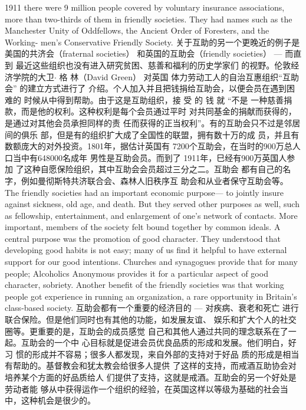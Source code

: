 \begin{paracol}{2}
1911 there were 9 million people covered by voluntary insurance associations, more than two-thirds of them in friendly societies. They had names such as the Manchester Unity of
Oddfellows, the Ancient Order of Foresters, and the Working-
men's Conservative Friendly Society.
\switchcolumn
关于互助的另一个更晚近的例子是美国的共济会（fraternal societies） 和英国的互助会（friendly societies） --- 而直到
最近这些组织也没有进入研究贫困、慈善和福利的历史学家们
的视野。伦敦经济学院的大卫$\cdot$ 格 林（David Green） 对英国
体力劳动工人的自治互惠组织“互助会” 的建立方式进行了
介绍。个人加入并且把钱捐给互助会，以便会员在遇到困难的
时候从中得到帮助。由于这是互助组织，接 受 的 钱 就 “不是
一种慈善捐款，而是他的权利。这种权利是每个会员通过平时
对共同基金的捐献而获得的，是通过对其他会员承担同样的责
任而获得的正当权利”。有的互助会只不过是邻居间的俱乐
部，但是有的组织扩大成了全国性的联盟，拥有数十万的成
员，并且有数额庞大的对外投资。1801年，据估计英国有
7200个互助会，在当时的900万总人口当中有648000名成年
男性是互助会员。而到了 1911年，巳经有900万英国人参加
了这种自愿保险组织，其中互助会会员超过三分之二。互助会
都有自己的名字，例如曼彻斯特共济联合会、森林人旧秩序互
助会和从业者保守互助会等。
\switchcolumn*
The friendly societies had an important economic purpose---
to jointly insure against sickness, old age, and death. But they
served other purposes as well, such as fellowship, entertainment, and enlargement of one's network of contacts. More important, members of the society felt bound together by
common ideals. A central purpose was the promotion of good
character. They understood that developing good habits is not
easy; many of us find it helpful to have external support for our
good intentions. Churches and synagogues provide that for
many people; Alcoholics Anonymous provides it for a particular
aspect of good character, sobriety. Another benefit of the friendly societies was that working people got experience in
running an organization, a rare opportunity in Britain's class-based society.
\switchcolumn
互助会都有一个重要的经济目的 --- 对疾病、衰老和死亡
进行联合保险。但是他们同时也有其他的功能，如发展友谊、
娱乐和扩大个人的社交圈等。更重要的是，互助会的成员感觉
自己和其他人通过共同的理念联系在了一起。互助会的一个中
心目标就是促进会员优良品质的形成和发展。他们明白，好习
惯的形成并不容易；很多人都发现，来自外部的支持对于好品
质的形成是相当有帮助的。基督教会和犹太教会给很多人提供
了这样的支持，而戒酒互助协会对培养某个方面的好品质给人
们提供了支持，这就是戒酒。互助会的另一个好处是劳动者能
够从中获得运作一个组织的经验，在英国这样以等级为基础的社会当中，这种机会是很少的。

\end{paracol}
